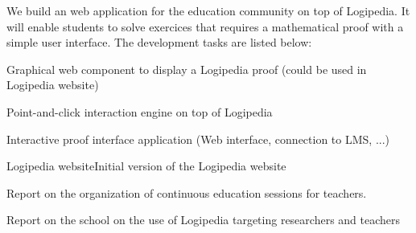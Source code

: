 \begin{workpackage}[id=dissemination,type=MGT,
  short={Dissemination, communication and exploitation},
  title={Dissemination, communication and exploitation},
  lead=Inr]
\begin{tasklist}
  \begin{task}[id=edukera,
      title=Web interface for doing proofs at school,
      lead=Edu,EduRM=12,wphases=12-24]
    We build an web application for the education community on top of Logipedia. It will
    enable students to solve exercices that requires a mathematical proof with a simple
    user interface.
    The development tasks are listed below:
    \begin{compactitem}
    \item Graphical web component to display a Logipedia proof (could be used in Logipedia website)
    \item Point-and-click interaction engine on top of Logipedia
    \item Interactive proof interface application (Web interface, connection to LMS, ...)
    \end{compactitem}
  \end{task}

\end{tasklist}

\begin{wpdelivs}


  \begin{wpdeliv}[due=1,miles=startup,id=requirements,dissem=PU,nature=DEC,lead=Inr]{Logipedia website}Initial version of the Logipedia website
  \end{wpdeliv}


  \begin{wpdeliv}[due=18,miles=???,id=continuoused,dissem=PU,nature=R,lead=Str]{
 Report on the organization of continuous education sessions for teachers.}
  \end{wpdeliv}

  \begin{wpdeliv}[due=48,miles=???,id=school-researchers,dissem=PU,nature=R,lead=Bir]{Report on the school on the use of Logipedia targeting researchers and teachers}
  \end{wpdeliv}



\end{wpdelivs}
\end{workpackage}
